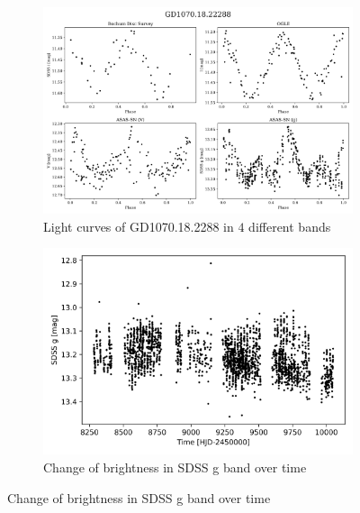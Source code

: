 \documentclass{pracalicmgr}
\begin{document}
\begin{figure}[H]
    \centering
    \begin{subfigure}[b]{1\textwidth}
       \includegraphics[width=1\linewidth]{plots/GD1070.18.22288/lc_comparsion.png}
       \caption{Light curves of GD1070.18.2288 in $4$ different bands}\label{comp}
       \label{fig:Ng1} 
    \end{subfigure}
    
    \begin{subfigure}[b]{1\textwidth}
       \includegraphics[width=1\linewidth]{plots/GD1070.18.22288/visibility_over_time.png}
       \caption{Change of brightness in SDSS g band over time  }\label{evolution}
    \end{subfigure}
\end{figure}
\end{document}
